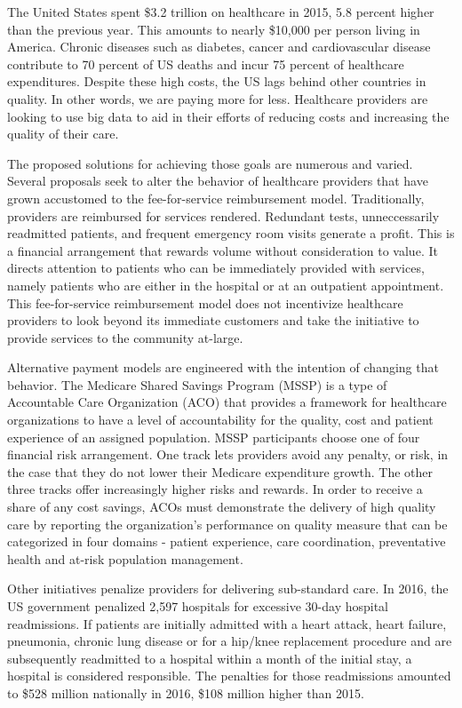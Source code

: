 \documentclass[sigconf]{acmart}
\begin{document}
 The United States spent \$3.2 trillion on healthcare in 2015, 5.8 percent higher than the previous year\cite{editor01}. This amounts to nearly \$10,000 per person living in America\cite{editor01}. Chronic diseases such as diabetes, cancer and cardiovascular disease contribute to 70 percent of US deaths and incur 75 percent of healthcare expenditures\cite{editor11}. Despite these high costs, the US lags behind other countries in quality\cite{editor06}. In other words, we are paying more for less. Healthcare providers are looking to use big data to aid in their efforts of reducing costs and increasing the quality of their care.

 The proposed solutions for achieving those goals are numerous and varied. Several proposals seek to alter the behavior of healthcare providers that have grown accustomed to the fee-for-service reimbursement model. Traditionally, providers are reimbursed for services rendered. Redundant tests, unneccessarily readmitted patients, and frequent emergency room visits generate a profit. This is a financial arrangement that rewards volume without consideration to value\cite{editor02}. It directs attention to patients who can be immediately provided with services, namely patients who are either in the hospital or at an outpatient appointment. This fee-for-service reimbursement model does not incentivize healthcare providers to look beyond its immediate customers and take the initiative to provide services to the community at-large.

 Alternative payment models are engineered with the intention of changing that behavior. The Medicare Shared Savings Program (MSSP) is a type of Accountable Care Organization (ACO) that provides a framework for healthcare organizations to have a level of accountability for the quality, cost and patient experience of an assigned population. MSSP participants choose one of four financial risk arrangement. One track lets providers avoid any penalty, or risk, in the case that they do not lower their Medicare expenditure growth. The other three tracks offer increasingly higher risks and rewards\cite{editor03}. In order to receive a share of any cost savings, ACOs  must demonstrate the delivery of high quality care by reporting the organization's performance on quality measure that can be categorized in four domains - patient experience, care coordination, preventative health and at-risk population management\cite{editor04}.

 Other initiatives penalize providers for delivering sub-standard care. In 2016, the US government penalized 2,597 hospitals for excessive 30-day hospital readmissions\cite{editor05}. If patients are initially admitted with a heart attack, heart failure, pneumonia, chronic lung disease or for a hip/knee replacement procedure and are subsequently readmitted to a hospital within a month of the initial stay, a hospital is considered responsible. The penalties for those readmissions amounted to \$528 million nationally in 2016, \$108 million higher than 2015\cite{editor05}.
\end{document}
